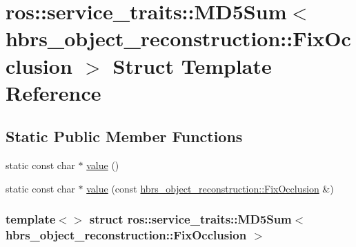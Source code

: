 \hypertarget{structros_1_1service__traits_1_1_m_d5_sum_3_01hbrs__object__reconstruction_1_1_fix_occlusion_01_4}{\section{ros\-:\-:service\-\_\-traits\-:\-:\-M\-D5\-Sum$<$ hbrs\-\_\-object\-\_\-reconstruction\-:\-:\-Fix\-Occlusion $>$ \-Struct \-Template \-Reference}
\label{structros_1_1service__traits_1_1_m_d5_sum_3_01hbrs__object__reconstruction_1_1_fix_occlusion_01_4}
}
\subsection*{\-Static \-Public \-Member \-Functions}
\begin{DoxyCompactItemize}
\item 
static const char $\ast$ \hyperlink{structros_1_1service__traits_1_1_m_d5_sum_3_01hbrs__object__reconstruction_1_1_fix_occlusion_01_4_a17c8efda2795a0570d8f2d8dad693ece}{value} ()
\item 
static const char $\ast$ \hyperlink{structros_1_1service__traits_1_1_m_d5_sum_3_01hbrs__object__reconstruction_1_1_fix_occlusion_01_4_acdadb74497e596c518519e4f4bf1b5af}{value} (const \hyperlink{structhbrs__object__reconstruction_1_1_fix_occlusion}{hbrs\-\_\-object\-\_\-reconstruction\-::\-Fix\-Occlusion} \&)
\end{DoxyCompactItemize}
\subsubsection*{template$<$$>$ struct ros\-::service\-\_\-traits\-::\-M\-D5\-Sum$<$ hbrs\-\_\-object\-\_\-reconstruction\-::\-Fix\-Occlusion $>$}



